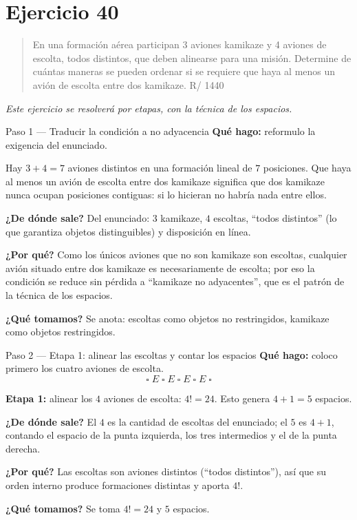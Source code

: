 \documentclass[11pt]{article}
\begin{document}
\section*{Ejercicio 40}

\begin{quote}
En una formación aérea participan 3 aviones kamikaze y 4 aviones de escolta, todos distintos, que deben alinearse para una misión. Determine de cuántas maneras se pueden ordenar si se requiere que haya al menos un avión de escolta entre dos kamikaze. \hfill R/ 1440
\end{quote}

\emph{Este ejercicio se resolverá por etapas, con la técnica de los espacios.}

\begin{paso}{Paso 1 --- Traducir la condición a no adyacencia}
\textbf{Qué hago:} reformulo la exigencia del enunciado.

Hay $3+4=7$ aviones distintos en una formación lineal de $7$ posiciones. Que haya al menos un avión de escolta entre dos kamikaze significa que dos kamikaze nunca ocupan posiciones contiguas: si lo hicieran no habría nada entre ellos.

\textbf{¿De dónde sale?} Del enunciado: $3$ kamikaze, $4$ escoltas, ``todos distintos'' (lo que garantiza objetos distinguibles) y disposición en línea.

\textbf{¿Por qué?} Como los únicos aviones que no son kamikaze son escoltas, cualquier avión situado entre dos kamikaze es necesariamente de escolta; por eso la condición se reduce sin pérdida a ``kamikaze no adyacentes'', que es el patrón de la técnica de los espacios.

\textbf{¿Qué tomamos?} Se anota: escoltas como objetos no restringidos, kamikaze como objetos restringidos.
\end{paso}

\begin{paso}{Paso 2 --- Etapa 1: alinear las escoltas y contar los espacios}
\textbf{Qué hago:} coloco primero los cuatro aviones de escolta.
\[
  \square\; E \;\square\; E \;\square\; E \;\square\; E \;\square
\]

\medskip
\textbf{Etapa 1:} alinear los $4$ aviones de escolta: $4!=24$. Esto genera $4+1=5$ espacios.

\textbf{¿De dónde sale?} El $4$ es la cantidad de escoltas del enunciado; el $5$ es $4+1$, contando el espacio de la punta izquierda, los tres intermedios y el de la punta derecha.

\textbf{¿Por qué?} Las escoltas son aviones distintos (``todos distintos''), así que su orden interno produce formaciones distintas y aporta $4!$.

\textbf{¿Qué tomamos?} Se toma $4!=24$ y $5$ espacios.
\end{paso}
\end{document}
